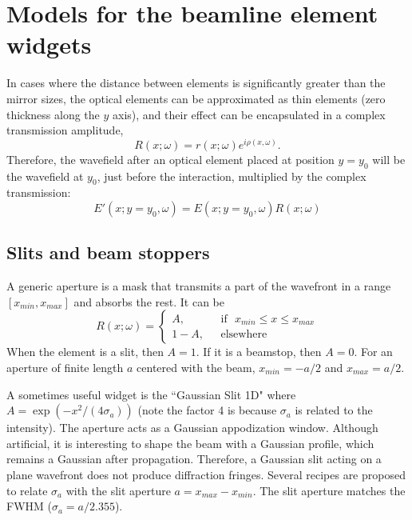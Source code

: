 \documentclass{iopconfser}
\begin{document}
\section{Models for the beamline element widgets}
\label{sec:elements}

In cases where the distance between elements is significantly greater than the mirror sizes, the optical elements can be approximated as thin elements (zero thickness along the $y$ axis), and their effect can be encapsulated in a complex transmission amplitude,
\begin{equation}
    \label{eq:thinelement}
    R(x;\omega)=r(x;\omega) e^{i \rho(x,\omega)}.
\end{equation}
Therefore, the wavefield after an optical element placed at position $y=y_0$ will be the wavefield at $y_0$, just before the interaction, multiplied by the complex transmission:
\begin{equation}
    E'(x;y=y_0,\omega) = E(x;y=y_0,\omega) R(x;\omega)
\end{equation}

\subsection{Slits and beam stoppers}

A generic aperture is a mask that transmits a part of the wavefront in a range $[x_{min},x_{max}]$ and absorbs the rest. It can be
\begin{equation}
R(x;\omega) =
\left\{
\begin{matrix}
A,  & \mbox{~~if~~} x_{min} \le x \le x_{max}
\\ 
1 - A, & \mbox{~~elsewhere}
\end{matrix}
\right.
\end{equation}
When the element is a slit, then $A=1$. If it is a beamstop, then $A=0$. For an aperture of finite length $a$ centered with the beam, $x_{min}=-a/2$ and $x_{max}=a/2$.

A sometimes useful widget is the ``Gaussian Slit 1D" where $A=\exp(-x^2/(4\sigma_a))$ (note the factor 4 is because $\sigma_a$ is related to the intensity). The aperture acts as a Gaussian appodization window. Although artificial, it is interesting to shape the beam with a Gaussian profile, which remains a Gaussian after propagation. Therefore, a Gaussian slit acting on a plane wavefront does not produce diffraction fringes. Several recipes are proposed to relate $\sigma_a$ with the slit aperture $a=x_{max}-x_{min}$. The slit aperture matches the FWHM ($\sigma_a=a/2.355$).
\end{document}
